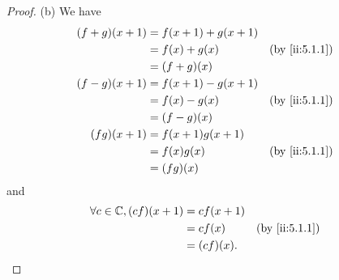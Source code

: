 \begin{proof}{(b)}
  We have
  \begin{align*}
    (f + g)(x + 1) & = f(x + 1) + g(x + 1)                 \\
                   & = f(x) + g(x)         &  & \by{ii:5.1.1} \\
                   & = (f + g)(x)                          \\
    (f - g)(x + 1) & = f(x + 1) - g(x + 1)                 \\
                   & = f(x) - g(x)         &  & \by{ii:5.1.1} \\
                   & = (f - g)(x)                          \\
    (f g)(x + 1)   & = f(x + 1) g(x + 1)                   \\
                   & = f(x) g(x)           &  & \by{ii:5.1.1} \\
                   & = (f g)(x)
  \end{align*}
  and
  \begin{align*}
    \forall c \in \C, (c f)(x + 1) & = c f(x + 1)                 \\
                                   & = c f(x)     &  & \by{ii:5.1.1} \\
                                   & = (c f)(x).
  \end{align*}
\end{proof}

